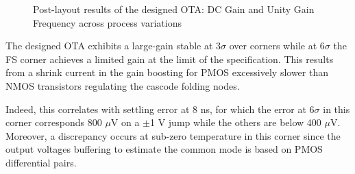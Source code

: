 \begin{figure}[htp]
    \centering
    \begin{subfigure}[b]{0.48\textwidth}
        \resizebox{\textwidth}{!}{
            
        }
        \label{fig:ota_dc_gain_temp_corners}
    \end{subfigure}
    \begin{subfigure}[b]{0.48\textwidth}
        \resizebox{\textwidth}{!}{
            
        }
        \label{fig:ota_dc_gain_temp_corners}
    \end{subfigure}
    \begin{subfigure}[b]{0.48\textwidth}
        \resizebox{\textwidth}{!}{
            
        }
        \label{fig:ota_ugf_temp_corners}
    \end{subfigure}
    \begin{subfigure}[b]{0.48\textwidth}
        \resizebox{\textwidth}{!}{
            
        }
        \label{fig:ota_ugf_1pF_temp_corners}
    \end{subfigure}
    \caption{Post-layout results of the designed OTA: DC Gain and Unity Gain Frequency across process variations}
    \label{fig:ota_result}
\end{figure}

The designed OTA exhibits a large-gain stable at \(3\sigma \) over corners while at \(6\sigma \) the FS corner achieves a limited gain at the limit of the specification. This results from a shrink current in the gain boosting for PMOS excessively slower than NMOS transistors regulating the cascode folding nodes.

Indeed, this correlates with settling error at 8 ns, for which the error at \(6\sigma \) in this corner corresponds 800 \(\mu \)V on a \(\pm \)1 V jump while the others are below 400 \(\mu \)V. Moreover, a discrepancy occurs at sub-zero temperature in this corner since the output voltages buffering to estimate the common mode is based on PMOS differential pairs.


